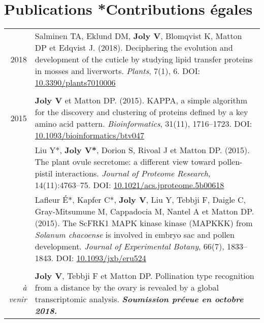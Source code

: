 \documentclass[letterpaper,12pt]{article}
\begin{document}
\section[Publications]{Publications \hfill \small{*Contributions égales}}
\begin{tabularx}{\textwidth}{@{}r|X@{}}

2018

& Salminen TA, Eklund DM, \textbf{Joly V}, Blomqvist K, Matton DP
  et Edqvist J. (2018).
  Deciphering the evolution and development of the cuticle by studying lipid
  transfer proteins in mosses and liverworts.
  \emph{Plants}, 7(1), 6.
  DOI: \href{http://doi.org/10.3390/plants7010006}{10.3390/plants7010006} \\

\multicolumn{2}{c}{} \\

2015
& \textbf{Joly V} et Matton DP. (2015).
  KAPPA, a simple algorithm for the discovery and clustering of proteins defined by
  a key amino acid pattern.
  \emph{Bioinformatics}, 31(11), 1716--1723.
  DOI: \href{http://doi.org/10.1093/bioinformatics/btv047}
  {10.1093/bioinformatics/btv047}
  \vspace{3mm} \\

& Liu Y*, \textbf{Joly V*}, Dorion S, Rivoal J et Matton DP. (2015).
  The plant ovule secretome: a different view toward pollen-pistil interactions.
  \emph{Journal of Proteome Research}, 14(11):4763--75.
  DOI: \href{http://doi.org/10.1021/acs.jproteome.5b00618}
  {10.1021/acs.jproteome.5b00618}
  \vspace{3mm} \\

& Lafleur É*, Kapfer C*, \textbf{Joly V}, Liu Y, Tebbji F, Daigle C,
  Gray-Mitsumune M, Cappadocia M, Nantel A et Matton DP. (2015).
  The ScFRK1 MAPK kinase kinase (MAPKKK) from \emph{Solanum chacoense} is
  involved in embryo sac and pollen development.
  \emph{Journal of Experimental Botany}, 66(7), 1833--1843.
  DOI: \href{http://doi.org/10.1093/jxb/eru524}{10.1093/jxb/eru524}
  \\

\multicolumn{2}{c}{} \\

{\em à venir}

& \textbf{Joly V}, Tebbji F et Matton DP.
  Pollination type recognition from a distance by the ovary is revealed by a global transcriptomic analysis. {\bfseries\em Soumission prévue en octobre 2018.} \vspace{3mm} \\


\end{tabularx}
\end{document}
